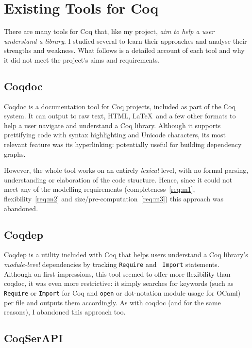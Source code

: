 \section{Existing Tools for Coq}\label{prep:coqtools}

There are many tools for Coq that, like my project, \emph{aim to help a user
understand a library}. I studied several to learn their approaches and analyse
their strengths and weakness. What follows is a detailed account of each tool
and why it did not meet the project's aims and requirements.

\subsection{Coqdoc}

Coqdoc is a documentation tool for Coq projects, included as part of the Coq
system. It can output to raw text, HTML, \LaTeX~and a few other formats to help
a user navigate and understand a Coq library.  Although it supports prettifying
code with syntax highlighting and Unicode characters, its most relevant feature
was its hyperlinking: potentially useful for building dependency graphs.

However, the whole tool works on an entirely \emph{lexical} level, with no
formal parsing, understanding or elaboration of the code structure. Hence, since
it could not meet any of the modelling requirements (completeness~\ref{req:m1},
flexibility~\ref{req:m2} and size/pre-computation~\ref{req:m3}) this approach was
abandoned.

\subsection{Coqdep}

Coqdep is a utility included with Coq that helps users understand a Coq
library's \emph{module-level} dependencies by tracking {\tt Require} and {\tt
Import} statements.  Although on first impressions, this tool seemed to offer
more flexibility than coqdoc, it was even more restrictive: it simply searches
for keywords (such as \texttt{Require} or \texttt{Import} for Coq  and
\texttt{open} or dot-notation module usage for OCaml) per file and outputs them
accordingly. As with coqdoc (and for the same reasons), I abandoned this
approach too.

\subsection{CoqSerAPI}

